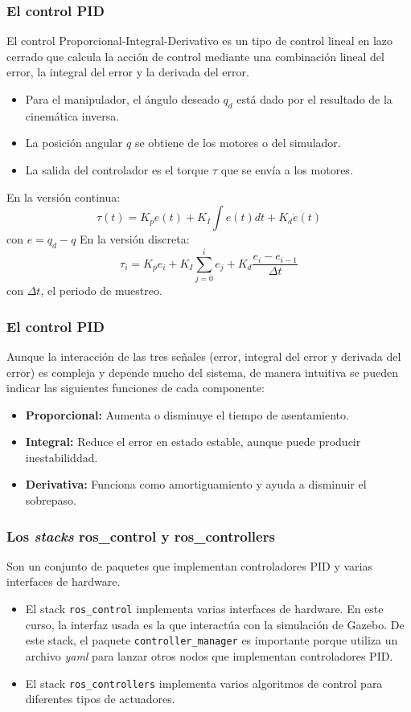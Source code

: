 \begin{frame}\frametitle{El control PID}
  El control Proporcional-Integral-Derivativo es un tipo de control lineal en lazo cerrado que calcula la acción de control mediante una combinación lineal del error, la integral del error y la derivada del error.
  \begin{itemize}
  \item Para el manipulador, el ángulo deseado $q_d$ está dado por el resultado de la cinemática inversa. 
  \item La posición angular $q$ se obtiene de los motores o del simulador.
  \item La salida del controlador es el torque $\tau$ que se envía a los motores.
  \end{itemize}
  En la versión continua:
  \[\tau(t) = K_p e(t) + K_I \int e(t)dt + K_d \dot{e}(t)\]
  con $e = q_d - q$
  En la versión discreta:
  \[\tau_i = K_p e_i + K_I\sum_{j=0}^i e_j + K_d\frac{e_i - e_{i-1}}{\Delta t}\]
  con $\Delta t$, el periodo de muestreo. 
\end{frame}

\begin{frame}\frametitle{El control PID}
  Aunque la interacción de las tres señales (error, integral del error y derivada del error) es compleja y depende mucho del sistema, de manera intuitiva se pueden indicar las siguientes funciones de cada componente:
  \begin{itemize}
  \item \textbf{Proporcional:} Aumenta o disminuye el tiempo de asentamiento.
  \item \textbf{Integral:} Reduce el error en estado estable, aunque puede producir inestabiliddad.
  \item \textbf{Derivativa:} Funciona como amortiguamiento y ayuda a disminuir el sobrepaso. 
  \end{itemize}
\end{frame}

\begin{frame}\frametitle{Los \textit{stacks} ros\_control y ros\_controllers}
  Son un conjunto de paquetes que implementan controladores PID y varias interfaces de hardware.
  \begin{itemize}
  \item El stack \texttt{ros\_control} implementa varias interfaces de hardware. En este curso, la interfaz usada es la que interactúa con la simulación de Gazebo. De este stack, el paquete \texttt{controller\_manager} es importante porque utiliza un archivo \textit{yaml} para lanzar otros nodos que implementan controladores PID. 
  \item El stack \texttt{ros\_controllers} implementa varios algoritmos de control para diferentes tipos de actuadores. 
  \end{itemize}
\end{frame}

